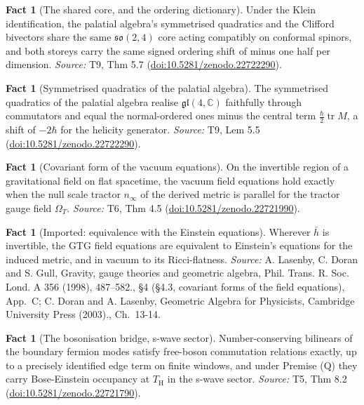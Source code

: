 \documentclass[11pt]{article}
\theoremstyle{definition}
\newtheorem{fact}[theorem]{Fact}
\theoremstyle{plain}
\providecommand{\C}{}\renewcommand{\C}{\mathbb{C}}
\providecommand{\TH}{}\renewcommand{\TH}{T_{\mathrm{H}}}
\providecommand{\hb}{}\renewcommand{\hb}{\bar{h}}
\providecommand{\nInf}{}\renewcommand{\nInf}{n_\infty}
\begin{document}
\begin{fact}[The shared core, and the ordering dictionary]\label{c:correspondence.shared-core-ordering-dictionary}
Under the Klein identification, the palatial algebra's symmetrised quadratics and the Clifford bivectors share the same $\mathfrak{so}(2,4)$ core acting compatibly on conformal spinors, and both storeys carry the same signed ordering shift of minus one half per dimension.
\emph{Source:} T9, Thm 5.7 (\href{https://doi.org/10.5281/zenodo.22722290}{doi:10.5281/zenodo.22722290}).
\end{fact}

\begin{fact}[Symmetrised quadratics of the palatial algebra]\label{c:correspondence.symmetrised-quadratics-palatial-algebra}
The symmetrised quadratics of the palatial algebra realise $\mathfrak{gl}(4,\C)$ faithfully through commutators and equal the normal-ordered ones minus the central term $\tfrac{\hbar}{2}\operatorname{tr}M$, a shift of $-2\hbar$ for the helicity generator.
\emph{Source:} T9, Lem 5.5 (\href{https://doi.org/10.5281/zenodo.22722290}{doi:10.5281/zenodo.22722290}).
\end{fact}

\begin{fact}[Covariant form of the vacuum equations]\label{c:interior.covariant-form-vacuum-equations}
On the invertible region of a gravitational field on flat spacetime, the vacuum field equations hold exactly when the null scale tractor $\nInf$ of the derived metric is parallel for the tractor gauge field $\Omega_{T}$.
\emph{Source:} T6, Thm 4.5 (\href{https://doi.org/10.5281/zenodo.22721990}{doi:10.5281/zenodo.22721990}).
\end{fact}

\begin{fact}[Imported: equivalence with the Einstein equations]\label{c:interior.imported-equivalence-einstein-equations}
Wherever $\hb$ is invertible, the GTG field equations are equivalent to Einstein's equations for the induced metric, and in vacuum to its Ricci-flatness.
\emph{Source:} A. Lasenby, C. Doran and S. Gull, Gravity, gauge theories and geometric algebra, Phil. Trans. R. Soc. Lond. A 356 (1998), 487--582., \S 4 (\S 4.3, covariant forms of the field equations), App.~C; C. Doran and A. Lasenby, Geometric Algebra for Physicists, Cambridge University Press (2003)., Ch.~13-14.
\end{fact}

\begin{fact}[The bosonisation bridge, s-wave sector]\label{c:singularity.bosonisation-bridge-s-wave-sector}
Number-conserving bilinears of the boundary fermion modes satisfy free-boson commutation relations exactly, up to a precisely identified edge term on finite windows, and under Premise (Q) they carry Bose-Einstein occupancy at $\TH$ in the s-wave sector.
\emph{Source:} T5, Thm 8.2 (\href{https://doi.org/10.5281/zenodo.22721790}{doi:10.5281/zenodo.22721790}).
\end{fact}
\end{document}
